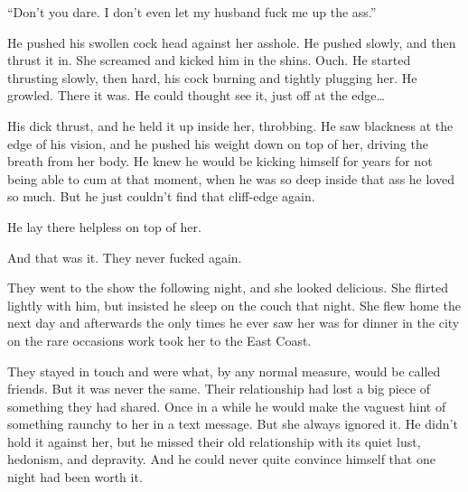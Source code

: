 \documentclass[letterpaper]{article}
\begin{document}
``Don't you dare. I don't even let my husband fuck me up the ass.''

He pushed his swollen cock head against her asshole. He pushed slowly, and then thrust it in.
She screamed and kicked him in the shins. Ouch.
He started thrusting slowly, then hard, his cock burning and tightly plugging her.
He growled. There it was. He could thought see it, just off at the edge\ldots

His dick thrust, and he held it up inside her, throbbing. He saw blackness at the edge of his vision, and he pushed his weight down on top of her, driving the breath from her body.
He knew he would be kicking himself for years for not being able to cum at that moment, when he was so deep inside that ass he loved so much. But he just couldn't find that cliff-edge again.

He lay there helpless on top of her.

And that was it.
They never fucked again. 

They went to the show the following night, and she looked delicious. 
She flirted lightly with him, but insisted he sleep on the couch that night. 
She flew home the next day and afterwards the only times he ever saw her was for dinner in the city on the rare occasions work took her to the East Coast.

They stayed in touch and were what, by any normal measure, would be called friends.
But it was never the same. Their relationship had lost a big piece of something they had shared.
Once in a while he would make the vaguest hint of something raunchy to her in a text message.
But she always ignored it. He didn't hold it against her, but he missed their old relationship with its quiet lust, hedonism, and depravity.
And he could never quite convince himself that one night had been worth it.






\end{document}
